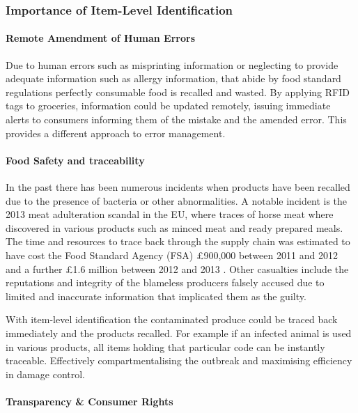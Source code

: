 \documentclass[a4paper, 11pt]{article}
\begin{document}
\vspace{\baselineskip}
\vspace{\baselineskip}
\vspace{\baselineskip}

\subsubsection{Importance of Item-Level Identification}

\paragraph{Remote Amendment of Human Errors}
Due to human errors such as misprinting information or neglecting to provide adequate information such as allergy information, that abide by food standard regulations perfectly consumable food is recalled and wasted.\cite{FDA} By applying RFID tags to groceries, information could be updated remotely, issuing immediate alerts to consumers informing them of the mistake and the amended error. This provides a different approach to error management.

\paragraph{Food Safety and traceability}
In the past there has been numerous incidents when products have been recalled due to the presence of bacteria or other abnormalities. A notable incident is the 2013 meat adulteration scandal in the EU, where traces of horse meat where discovered in various products such as minced meat and ready prepared meals. The time and resources to trace back through the supply chain was estimated to have cost the Food Standard Agency (FSA) \pounds900,000 between 2011 and 2012 and a further \pounds1.6 million between 2012 and 2013 \cite{3}. Other casualties include the reputations and integrity of the blameless producers falsely accused due to limited and inaccurate information that implicated them as the guilty.\cite{horsy}

With item-level identification the contaminated produce could be traced back immediately and the products recalled.\cite{rfidFood}\cite{rfidFood2} For example if an infected animal is used in various products, all items holding that particular code can be instantly traceable. Effectively compartmentalising the outbreak and maximising efficiency in damage control.

\paragraph{Transparency \& Consumer Rights}
\end{document}
